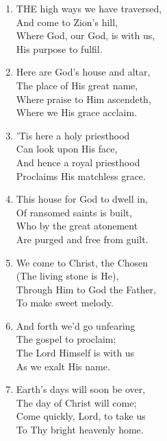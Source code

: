 \begin{enumerate}
    \item THE high ways we have traversed, \\
        And come to Zion's hill, \\
        Where God, our God, is with us, \\
        His purpose to fulfil.

    \item Here are God's house and altar, \\
        The place of His great name, \\
        Where praise to Him ascendeth, \\
        Where we His grace acclaim.

    \item 'Tis here a holy priesthood \\
        Can look upon His face, \\
        And hence a royal priesthood \\
        Proclaims His matchless grace.

    \item This house for God to dwell in, \\
        Of ransomed saints is built, \\
        Who by the great atonement \\
        Are purged and free from guilt.

    \item We come to Christ, the Chosen \\
        (The living stone is He), \\
        Through Him to God the Father, \\
        To make sweet melody.

    \item And forth we'd go unfearing \\
        The gospel to proclaim; \\
        The Lord Himself is with us \\
        As we exalt His name.

    \item Earth's days will soon be over, \\
        The day of Christ will come; \\
        Come quickly, Lord, to take us \\
        To Thy bright heavenly home.

\end{enumerate}

